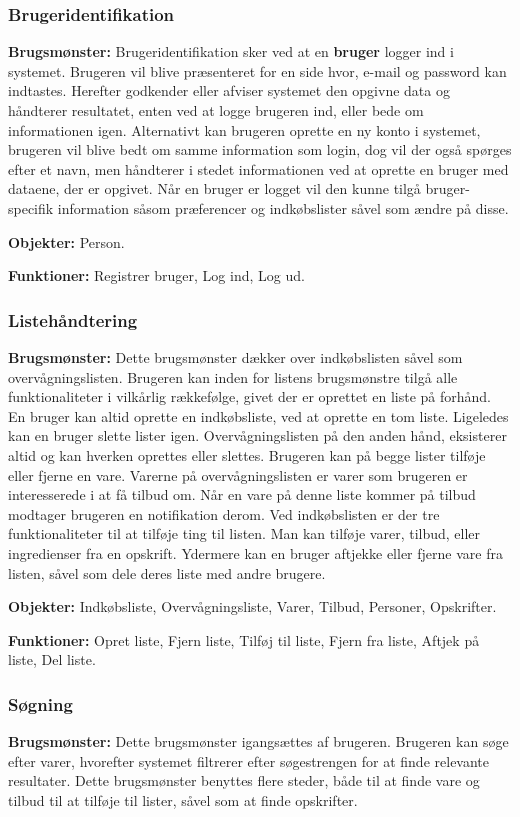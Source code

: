 \subsubsection*{Brugeridentifikation}
\textbf{Brugsmønster:} Brugeridentifikation sker ved at en \textbf{bruger} logger ind i systemet.
Brugeren vil blive præsenteret for en side hvor, e-mail og password kan indtastes.
Herefter godkender eller afviser systemet den opgivne data og håndterer resultatet, enten ved at logge brugeren ind, eller bede om informationen igen.
Alternativt kan brugeren oprette en ny konto i systemet, brugeren vil blive bedt om samme information som login, dog vil der også spørges efter et navn, men håndterer i stedet informationen ved at oprette en bruger med dataene, der er opgivet.
Når en bruger er logget vil den kunne tilgå bruger-specifik information såsom præferencer og indkøbslister såvel som ændre på disse.

\textbf{Objekter:} Person.

\textbf{Funktioner:} Registrer bruger, Log ind, Log ud.

\subsubsection*{Listehåndtering}
\textbf{Brugsmønster:} Dette brugsmønster dækker over indkøbslisten såvel som overvågningslisten.
Brugeren kan inden for listens brugsmønstre tilgå alle funktionaliteter i vilkårlig rækkefølge, givet der er oprettet en liste på forhånd.
En bruger kan altid oprette en indkøbsliste, ved at oprette en tom liste.
Ligeledes kan en bruger slette lister igen.
Overvågningslisten på den anden hånd, eksisterer altid og kan hverken oprettes eller slettes.
Brugeren kan på begge lister tilføje eller fjerne en vare.
Varerne på overvågningslisten er varer som brugeren er interesserede i at få tilbud om.
Når en vare på denne liste kommer på tilbud modtager brugeren en notifikation derom.
Ved indkøbslisten er der tre funktionaliteter til at tilføje ting til listen.
Man kan tilføje varer, tilbud, eller ingredienser fra en opskrift.
Ydermere kan en bruger aftjekke eller fjerne vare fra listen, såvel som dele deres liste med andre brugere.

\textbf{Objekter:} Indkøbsliste, Overvågningsliste, Varer, Tilbud, Personer, Opskrifter.

\textbf{Funktioner:} Opret liste, Fjern liste, Tilføj til liste, Fjern fra liste, Aftjek på liste, Del liste.

\subsubsection*{Søgning}
\textbf{Brugsmønster:} Dette brugsmønster igangsættes af brugeren.
Brugeren kan søge efter varer, hvorefter systemet filtrerer efter søgestrengen for at finde relevante resultater.
Dette brugsmønster benyttes flere steder, både til at finde vare og tilbud til at tilføje til lister, såvel som at finde opskrifter.


